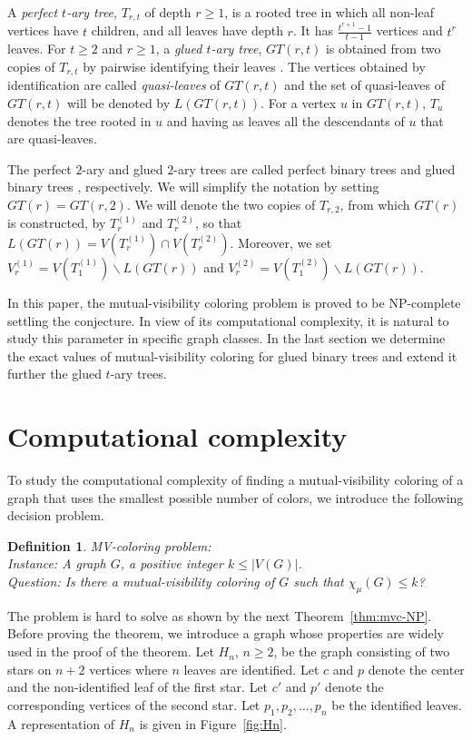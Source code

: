 \documentclass[12pt]{article}
\newtheorem{definition}[theorem]{Definition}
\begin{document}
A {\it perfect $t$-ary tree}, $T_{r,t}$ of depth $r \geq 1$, is a rooted tree in which all non-leaf vertices have $t$ children, and all leaves have depth $r$. It has $\frac{t^{r+1}-1}{t-1}$ vertices and $t^r$ leaves. For $t \geq 2$ and $r \geq 1$, a {\it glued $t$-ary tree}, $GT(r,t)$ is obtained from two copies of $T_{r,t}$ by pairwise identifying their leaves \cite{Klavzar-2025b}. The vertices obtained by identification are called {\it quasi-leaves} of $GT(r,t)$ and the set of quasi-leaves of $GT(r,t)$ will be denoted by $L(GT(r,t))$. For a vertex $u$ in $GT(r,t)$, $T_u $ denotes the tree rooted in $u$ and having as leaves all the descendants of $u$ that are quasi-leaves.\par

The perfect $2$-ary and glued $2$-ary trees are called perfect binary trees and glued binary trees \cite{GPS2}, respectively. We will simplify the notation by setting $GT(r)=GT(r,2)$. We will denote the two copies of $T_{r,2}$, from which $GT(r)$ is constructed, by $T_r^{(1)}$ and $T_r^{(2)}$, so that $L(GT(r))= V(T_r^{(1)}) \cap V(T_r^{(2)})$. Moreover, we set $V_r^{(1)} = V(T_1^{(1)}) \backslash L(GT(r))$ and $V_r^{(2)} = V(T_1^{(2)}) \backslash L(GT(r))$.\par

In this paper, the mutual-visibility coloring problem is proved to be NP-complete settling the conjecture. In view of its computational complexity, it is natural to study this parameter in specific graph classes. In the last section we determine the exact values of mutual-visibility coloring for glued binary trees and extend it further the glued $t$-ary trees.
	
\section{Computational complexity}\label{sec:complexity}
To study the computational complexity of finding a mutual-visibility coloring of a graph that uses the smallest possible number of colors, we introduce the following decision problem.
%
\begin{definition}
{\sc MV-coloring} problem: \\
{\sc Instance}: A graph $G$, a positive integer $k\leq |V(G)|$. \\
{\sc Question}: Is there a mutual-visibility coloring of $G$ such that $\chi_\mu(G)\leq k$?
\end{definition}
%
The problem is hard to solve as shown by the next Theorem~\ref{thm:mvc-NP}. Before proving the theorem, we introduce a graph whose properties are widely used in the proof of the theorem.
Let $H_n$, $n\geq 2$, be the graph consisting of two stars on $n+2$ vertices where $n$ leaves are identified. Let $c$ and $p$ denote the center and the non-identified leaf of the first star. Let $c'$ and $p'$ denote the corresponding vertices of the second star.
Let $p_1, p_2,\ldots,p_n$ be the identified leaves. A representation of $H_n$ is given in Figure~\ref{fig:Hn}.
\end{document}
